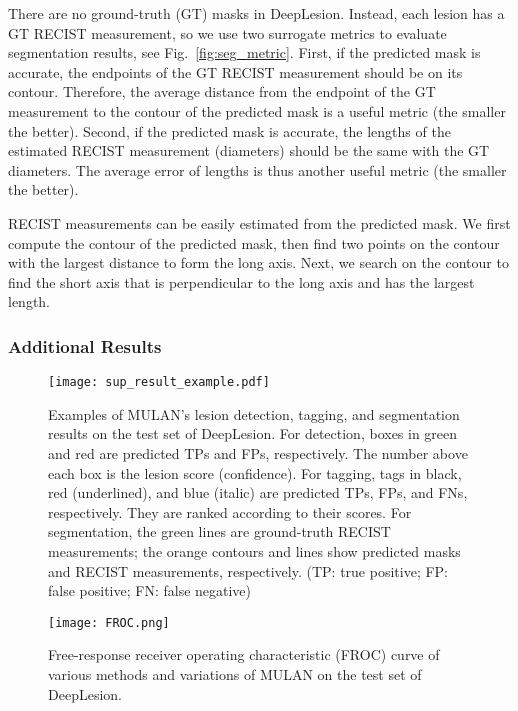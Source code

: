 \documentclass[runningheads]{llncs}
\def\Fig#1{{Fig.\ \ref{fig:#1}}}
\begin{document}
There are no ground-truth (GT) masks in DeepLesion. Instead, each lesion has a GT RECIST measurement, so we use two surrogate metrics to evaluate segmentation results, see \Fig{seg_metric}. First, if the predicted mask is accurate, the endpoints of the GT RECIST measurement should be on its contour. Therefore, the average distance from the endpoint of the GT measurement to the contour of the predicted mask is a useful metric (the smaller the better). Second, if the predicted mask is accurate, the lengths of the estimated RECIST measurement (diameters) should be the same with the GT diameters. The average error of lengths is thus another useful metric (the smaller the better).

RECIST measurements \cite{Tang2018RECIST} can be easily estimated from the predicted mask. We first compute the contour of the predicted mask, then find two points on the contour with the largest distance to form the long axis. Next, we search on the contour to find the short axis that is perpendicular to the long axis and has the largest length.

\subsubsection{Additional Results}

\begin{figure}[]
	\begin{center}
\texttt{[image: sup\_result\_example.pdf]} \end{center}
	\caption{Examples of MULAN's lesion detection, tagging, and segmentation results on the test set of DeepLesion. For detection, boxes in green and red are predicted TPs and FPs, respectively. The number above each box is the lesion score (confidence). For tagging, tags in black, red (underlined), and blue (italic) are predicted TPs, FPs, and FNs, respectively. They are ranked according to their scores. For segmentation, the green lines are ground-truth RECIST measurements; the orange contours and lines show predicted masks and RECIST measurements, respectively. (TP: true positive; FP: false positive; FN: false negative)}
	\label{fig:sup_result_example}
\end{figure}

\begin{figure}[]
	\begin{center}
\texttt{[image: FROC.png]} \end{center}
	\caption{Free-response receiver operating characteristic (FROC) curve of various methods and variations of MULAN on the test set of DeepLesion.}
	\label{fig:FROC}
\end{figure}
\end{document}
